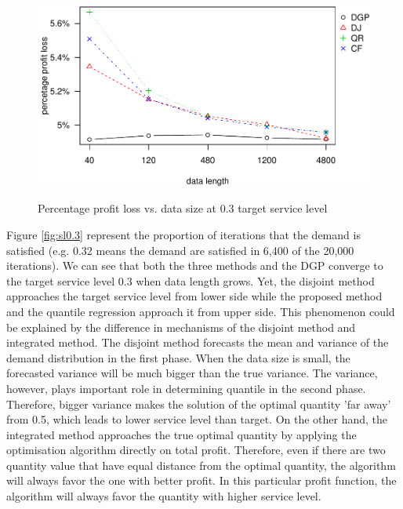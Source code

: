 \documentclass{article}
\begin{document}
\begin{figure}[ht]
\centering
\caption{Percentage profit loss vs. data size at 0.3 target service level}
\includegraphics{ppl0.3-1.pdf}
\label{fig:ppl0.3}
\end{figure}

Figure \ref{fig:sl0.3} represent the proportion of iterations that the demand is satisfied (e.g. 0.32 means the demand are satisfied in 6,400 of the 20,000 iterations). We can see that both the three methods and the DGP converge to the target service level 0.3 when data length grows. Yet, the disjoint method approaches the target service level from lower side while the proposed method and the quantile regression approach it from upper side. This phenomenon could be explained by the difference in mechanisms of the disjoint method and integrated method. The disjoint method forecasts the mean and variance of the demand distribution in the first phase. When the data size is small, the forecasted variance will be much bigger than the true variance. The variance, however, plays important role in determining quantile in the second phase. Therefore, bigger variance makes the solution of the optimal quantity 'far away' from 0.5, which leads to lower service level than target. On the other hand, the integrated method approaches the true optimal quantity by applying the optimisation algorithm directly on total profit. Therefore, even if there are two quantity value that have equal distance from the optimal quantity, the algorithm will always favor the one with better profit. In this particular profit function, the algorithm will always favor the quantity with higher service level.
\end{document}
